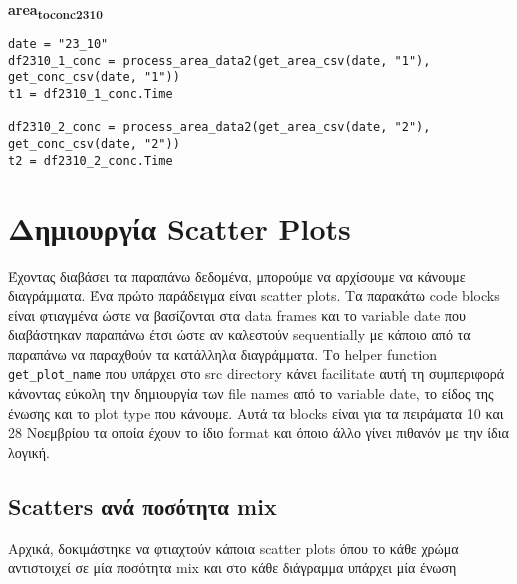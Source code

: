 \documentclass[11pt]{article}
\begin{document}
\textbf{area\textsubscript{to}\textsubscript{conc}\textsubscript{23}\textsubscript{10}}
\begin{verbatim}
date = "23_10"
df2310_1_conc = process_area_data2(get_area_csv(date, "1"), get_conc_csv(date, "1"))
t1 = df2310_1_conc.Time

df2310_2_conc = process_area_data2(get_area_csv(date, "2"), get_conc_csv(date, "2"))
t2 = df2310_2_conc.Time
\end{verbatim}

\section{Δημιουργία Scatter Plots}
\label{sec:org891e401}
Έχοντας διαβάσει τα παραπάνω δεδομένα, μπορούμε να αρχίσουμε να κάνουμε διαγράμματα. Ένα πρώτο παράδειγμα είναι scatter plots. Τα παρακάτω code blocks είναι φτιαγμένα ώστε να βασίζονται στα data frames και το variable date που διαβάστηκαν παραπάνω έτσι ώστε αν καλεστούν sequentially με κάποιο από τα παραπάνω να παραχθούν τα κατάλληλα διαγράμματα. Το helper function \texttt{get\_plot\_name} που υπάρχει στο src directory κάνει facilitate αυτή τη συμπεριφορά κάνοντας εύκολη την δημιουργία των file names από το variable date, το είδος της ένωσης και το plot type που κάνουμε. Αυτά τα blocks είναι για τα πειράματα 10 και 28 Νοεμβρίου τα οποία έχουν το ίδιο format και όποιο άλλο γίνει πιθανόν με την ίδια λογική.

\subsection{Scatters ανά ποσότητα mix}
\label{sec:orgeaf4790}
Αρχικά, δοκιμάστηκε να φτιαχτούν κάποια scatter plots όπου το κάθε χρώμα αντιστοιχεί σε μία ποσότητα mix και στο κάθε διάγραμμα υπάρχει μία ένωση
\end{document}
